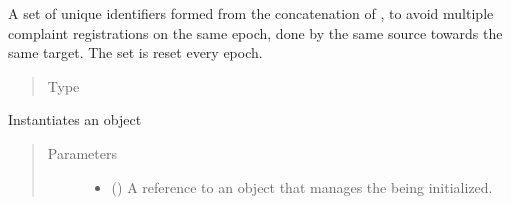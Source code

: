 \documentclass[letterpaper,10pt,english]{sphinxmanual}
\begin{document}
\begin{fulllineitems}

\begin{fulllineitems}
\label{\detokenize{app.domain:app.domain.cluster_groups.SGClusterExt._epoch_complaints}}
A set of unique identifiers formed from the concatenation of
{\hyperref[\detokenize{app.domain:app.domain.network_nodes.Node.id}]{}},
to avoid multiple complaint registrations on the same epoch,
done by the same source towards the same target. The set is
reset every epoch.
\begin{quote}\begin{description}
\item[{Type}] \leavevmode
{}

\end{description}\end{quote}

\end{fulllineitems}


\begin{fulllineitems}
\label{\detokenize{app.domain:app.domain.cluster_groups.SGClusterExt.__init__}}
Instantiates an  object
\begin{quote}\begin{description}
\item[{Parameters}] \leavevmode\begin{itemize}
\item {} 
 ({\hyperref[\detokenize{app:app.type_hints.MasterType}]{}}) \textendash{} A reference to an {\hyperref[\detokenize{app.domain:app.domain.master_servers.Master}]{}}
object that manages the  being initialized.


\end{itemize}
\end{description}
\end{quote}
\end{fulllineitems}
\end{fulllineitems}
\end{document}
